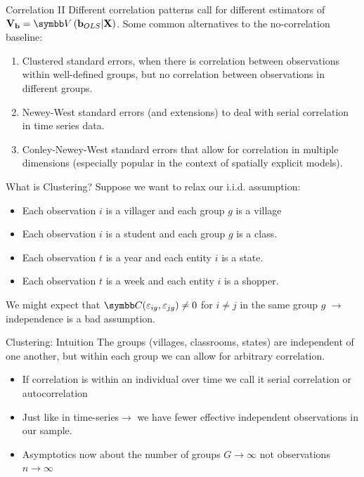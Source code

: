 \documentclass[aspectratio=169,11pt]{beamer}
\begin{document}
\begin{frame}{Correlation II}
 Different correlation patterns call for different estimators of ${\bf V}_{{\bf b}} = \Var\left({\bf b}_{OLS}|{\bf X}\right)$.
	Some common alternatives to the no-correlation baseline:
\begin{enumerate}
	\item Clustered standard errors, when there is correlation between observations
	within well-defined groups, but no correlation between observations in different groups. 
	\item Newey-West standard errors (and extensions) to deal with serial correlation
	in time series data.
	\item Conley-Newey-West standard errors that allow for correlation in multiple dimensions
	(especially popular in the context of spatially explicit models).
\end{enumerate}
\end{frame}


\begin{frame}{What is Clustering?}
Suppose we want to relax our i.i.d. assumption:
\begin{itemize}
\item Each observation $i$ is a \alert{villager} and each group $g$ is a \alert{village}
\item Each observation $i$ is a \alert{student} and each group $g$ is a \alert{class}.
\item Each observation $t$ is a \alert{year} and each entity $i$ is a \alert{state}.
\item Each observation $t$ is a \alert{week} and each entity $i$ is a \alert{shopper}.
\end{itemize}
We might expect that $\Cov (\varepsilon_{ig},\varepsilon_{jg}) \neq 0$ for $i \ne j$ in the same group $g$ $\rightarrow$ independence is a bad assumption. 
\end{frame}

\begin{frame}{Clustering: Intuition}
The groups (villages, classrooms, states) are independent of one another, but within each group we can allow for arbitrary correlation.
\begin{itemize}
\item If correlation is within an individual over time we call it \alert{serial correlation} or \alert{autocorrelation}
\item Just like in time-series$\rightarrow$ we have fewer effective independent observations in our sample.
\item Asymptotics now about the number of groups $G \rightarrow \infty$ not observations $n \rightarrow \infty$
\end{itemize}
\end{frame}
\end{document}
